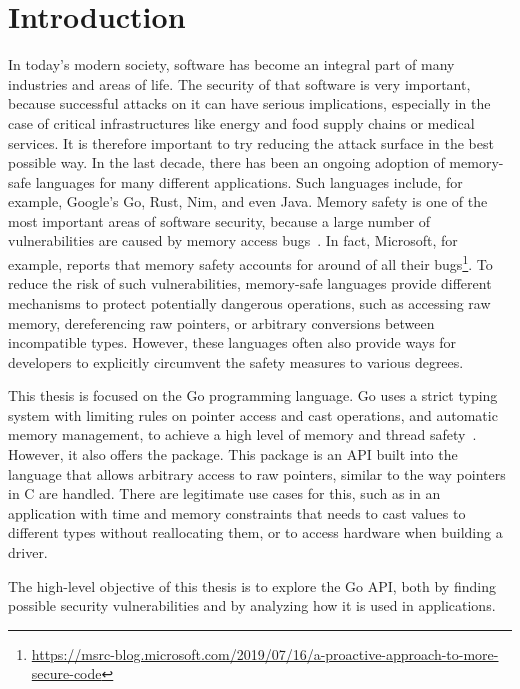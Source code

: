 
\chapter{Introduction}\label{ch:introduction}

In today's modern society, software has become an integral part of many industries and areas of life.
The security of that software is very important, because successful attacks on it can have serious implications,
especially in the case of critical infrastructures like energy and food supply chains or medical services.
It is therefore important to try reducing the attack surface in the best possible way.
In the last decade, there has been an ongoing adoption of memory-safe languages for many different applications.
Such languages include, for example, Google's Go, Rust, Nim, and even Java.
Memory safety is one of the most important areas of software security, because a large number of vulnerabilities are
caused by memory access bugs~\cite{heffley2004}.
In fact, Microsoft, for example, reports that memory safety accounts for around  of all their
bugs\footnote{\scriptsize\url{https://msrc-blog.microsoft.com/2019/07/16/a-proactive-approach-to-more-secure-code}}.
To reduce the risk of such vulnerabilities, memory-safe languages provide different mechanisms to protect potentially
dangerous operations, such as accessing raw memory, dereferencing raw pointers, or arbitrary conversions between
incompatible types.
However, these languages often also provide ways for developers to explicitly circumvent the safety measures to various
degrees.

This thesis is focused on the Go programming language.
Go uses a strict typing system with limiting rules on pointer access and cast operations, and automatic memory
management, to achieve a high level of memory and thread safety~\cite{sibiryov2017}.
However, it also offers the \unsafe{} package.
This package is an \acrshort{API} built into the language that allows arbitrary access to raw pointers, similar to the
way pointers in C are handled.
There are legitimate use cases for this, such as in an application with time and memory constraints that needs to cast
values to different types without reallocating them, or to access hardware when building a driver.

\begin{hero}
    The high-level objective of this thesis is to explore the Go \unsafe{} \acrshort{API}, both by finding possible
    security vulnerabilities and by analyzing how it is used in applications.
\end{hero}

